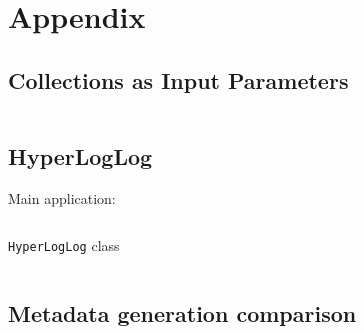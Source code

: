 \section{Appendix}
\label{sec:appendix}

\subsection{Collections as Input Parameters}
\label{subsec:col_in_program}
\inputminted{python}{applications/COLLECTION_IN/resources_in_master.py}


\subsection{HyperLogLog}
\label{subsec:hyperloglog_source_code}
Main application:
\inputminted{python}{applications/HYPERLOGLOG/main.py}
\verb|HyperLogLog| class
\inputminted{python}{applications/HYPERLOGLOG/HyperLogLog.py}


\subsection{Metadata generation comparison}
\label{subsec:reduce_data_comparison}

